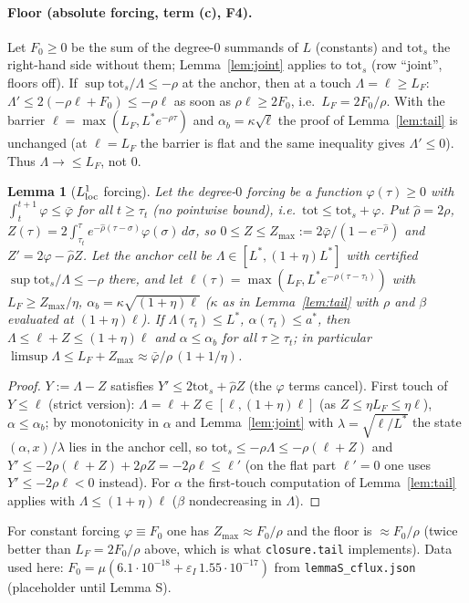 \documentclass[11pt]{article}
\newtheorem{lemma}{Lemma}
\theoremstyle{definition}
\newcommand{\Ly}{\Lambda}
\newcommand{\tot}{\mathrm{tot}}
\begin{document}
\paragraph{Floor (absolute forcing, term (c), F4).} Let $F_0\ge0$ be the sum of the degree-$0$ summands of $L$ (constants) and $\mathrm{tot}_s$ the right-hand side without them; Lemma~\ref{lem:joint} applies to $\mathrm{tot}_s$ (row ``joint'', floors off). If $\sup\tot_s/\Ly\le-\rho$ at the anchor, then at a touch $\Ly=\ell\ge L_F$: $\Ly'\le2(-\rho\ell+F_0)\le-\rho\ell$ as soon as $\rho\ell\ge2F_0$, i.e.\ $L_F=2F_0/\rho$. With the barrier $\ell=\max(L_F,L^*e^{-\rho\tau})$ and $\alpha_b=\kappa\sqrt\ell$ the proof of Lemma~\ref{lem:tail} is unchanged (at $\ell=L_F$ the barrier is flat and the same inequality gives $\Ly'\le0$). Thus $\Ly\to\le L_F$, not $0$.

\begin{lemma}[$L^1_{\rm loc}$ forcing]\label{lem:l1} Let the degree-$0$ forcing be a function $\varphi(\tau)\ge0$ with $\int_t^{t+1}\varphi\le\bar\varphi$ for all $t\ge\tau_t$ (no pointwise bound), i.e.\ $\tot\le\tot_s+\varphi$. Put $\hat\rho=2\rho$, $Z(\tau)=2\int_{\tau_t}^\tau e^{-\hat\rho(\tau-\sigma)}\varphi(\sigma)\,d\sigma$, so $0\le Z\le Z_{\max}:=2\bar\varphi/(1-e^{-\hat\rho})$ and $Z'=2\varphi-\hat\rho Z$. Let the anchor cell be $\Ly\in[L^*,(1+\eta)L^*]$ with certified $\sup\tot_s/\Ly\le-\rho$ there, and let $\ell(\tau)=\max(L_F,L^*e^{-\rho(\tau-\tau_t)})$ with $L_F\ge Z_{\max}/\eta$, $\alpha_b=\kappa\sqrt{(1+\eta)\ell}$ ($\kappa$ as in Lemma~\ref{lem:tail} with $\rho$ and $\beta$ evaluated at $(1+\eta)\ell$). If $\Ly(\tau_t)\le L^*$, $\alpha(\tau_t)\le a^*$, then $\Ly\le\ell+Z\le(1+\eta)\ell$ and $\alpha\le\alpha_b$ for all $\tau\ge\tau_t$; in particular $\limsup\Ly\le L_F+Z_{\max}\approx\bar\varphi/\rho\,(1+1/\eta)$.
\end{lemma}
\begin{proof} $Y:=\Ly-Z$ satisfies $Y'\le2\tot_s+\hat\rho Z$ (the $\varphi$ terms cancel). First touch of $Y\le\ell$ (strict version): $\Ly=\ell+Z\in[\ell,(1+\eta)\ell]$ (as $Z\le\eta L_F\le\eta\ell$), $\alpha\le\alpha_b$; by monotonicity in $\alpha$ and Lemma~\ref{lem:joint} with $\lambda=\sqrt{\ell/L^*}$ the state $(\alpha,x)/\lambda$ lies in the anchor cell, so $\tot_s\le-\rho\Ly\le-\rho(\ell+Z)$ and $Y'\le-2\rho(\ell+Z)+2\rho Z=-2\rho\ell\le\ell'$ (on the flat part $\ell'=0$ one uses $Y'\le-2\rho\ell<0$ instead). For $\alpha$ the first-touch computation of Lemma~\ref{lem:tail} applies with $\Ly\le(1+\eta)\ell$ ($\beta$ nondecreasing in $\Ly$). \end{proof}
For constant forcing $\varphi\equiv F_0$ one has $Z_{\max}\approx F_0/\rho$ and the floor is $\approx F_0/\rho$ (twice better than $L_F=2F_0/\rho$ above, which is what \texttt{closure.tail} implements). Data used here: $F_0=\mu(6.1\!\cdot\!10^{-18}+\varepsilon_I\,1.55\!\cdot\!10^{-17})$ from \texttt{lemmaS\_cflux.json} (placeholder until Lemma S).
\end{document}
